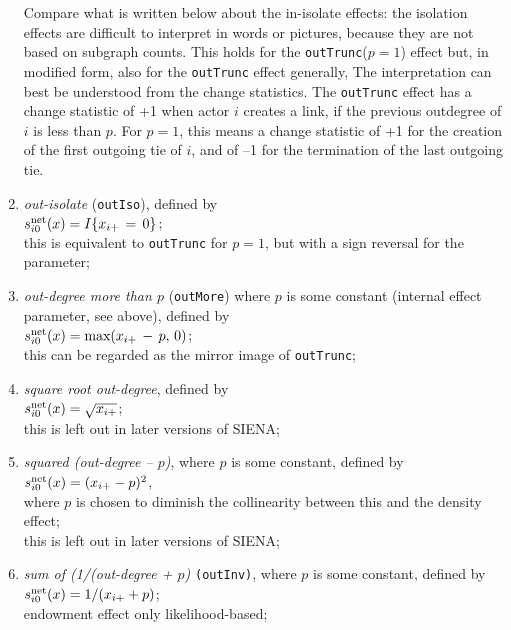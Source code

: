 \documentclass[a4paper,fleqn,11pt]{article}
\newcommand{\+}{\, + \,}
\newcommand{\si}{{\sf SIENA}}
\newcommand{\vit}{\theenumi}
\begin{document}
\begin{enumerate}
 Compare what is written below about the in-isolate effects:
     the isolation effects are difficult to interpret in words or pictures,
     because they are not based on subgraph counts.
 This holds for the \texttt{outTrunc}($p=1$) effect but, in modified form,
 also for the \texttt{outTrunc} effect generally,
 The interpretation can best be understood from the change statistics.
 The \texttt{outTrunc} effect has a change statistic of +1 when actor $i$
 creates a link, if the previous outdegree of $i$ is less than $p$.
 For $p=1$, this means a change statistic of +1 for the creation of the
 first outgoing tie of $i$, and of --1 for the termination of the last outgoing tie.

 \item {\em out-isolate} (\texttt{outIso}), defined by \\
 $s^{\rm net}_{i\vit}(x) = I\{x_{i+} \,=\,  0\}$;\\
 this is equivalent to \texttt{outTrunc} for $p=1$,
 but with a sign reversal for the parameter;


 \item {\em out-degree more than $p$} (\texttt{outMore})
 where $p$ is some constant
 (internal effect parameter, see above), defined by \\
 $s^{\rm net}_{i\vit}(x) = \text{max}(x_{i+}\,-\, p, \, 0)$;\\
 this can be regarded as the mirror image of \texttt{outTrunc};

 \item {\em square root out-degree}, defined by  \\
 $s^{\rm net}_{i\vit}(x) = \sqrt{x_{i+}}$;\\
 this is left out in later versions of \si;

 \item {\em squared (out-degree -- $p$)}, where $p$ is some constant,
 defined by  \\
 $s^{\rm net}_{i\vit}(x) = (x_{i+} - p)^2$,\\
 where $p$ is chosen to diminish the collinearity between this
 and the density effect;\\
 this is left out in later versions of \si;

 \item {\em sum of (1/(out-degree + $p$)} \texttt{(outInv)},
 where $p$ is some constant,  defined by  \\
 $s^{\rm net}_{i\vit}(x) = 1/(x_{i+} + p)$;\\
 endowment effect only likelihood-based;


\end{enumerate}
\end{document}
